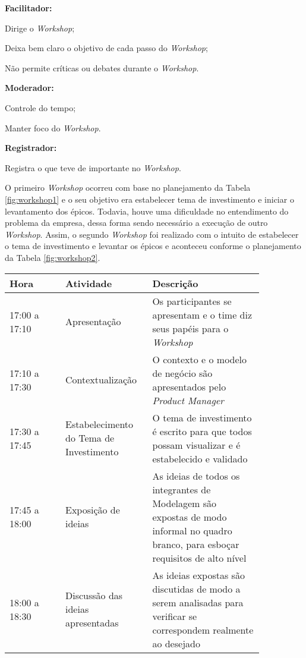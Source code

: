 \textbf{Facilitador:}

	Dirige o \textit{Workshop};
	
	Deixa bem claro o objetivo de cada passo do \textit{Workshop};
	
	Não permite críticas ou debates durante o \textit{Workshop}.
		
\textbf{Moderador:}

	Controle do tempo;
	
	Manter foco do \textit{Workshop}.
	
\textbf{Registrador:}

	Registra o que teve de importante no \textit{Workshop}.
	
O primeiro \textit{Workshop} ocorreu com base no planejamento da Tabela \ref{fig:workshop1} e o seu objetivo
era estabelecer tema de investimento e iniciar o levantamento dos épicos. Todavia, houve uma dificuldade no entendimento
do problema da empresa, dessa forma sendo necessário a execução de outro \textit{Workshop}. 
Assim, o segundo \textit{Workshop} foi realizado com o intuito de estabelecer o tema de investimento e levantar os épicos e aconteceu conforme o planejamento da Tabela
\ref{fig:workshop2}.

\begin{table*}[!h]
\centering
\caption{Planejamento do \textit{Workshop} 1}
\label{fig:workshop1}
  \begin{tabular}{p{0.20\linewidth}p{0.25\linewidth}p{0.40\linewidth}}
  \hline
   Hora  & Atividade & Descrição\\
  \hline

  17:00 a 17:10 & Apresentação & Os participantes se apresentam e o time diz seus papéis para o \textit{Workshop}\\

  17:10 a 17:30  & Contextualização & O contexto e o modelo de negócio são apresentados pelo \textit{Product Manager}\\

  17:30 a 17:45 & Estabelecimento do Tema de Investimento & O tema de investimento é escrito para que todos possam visualizar e é estabelecido e validado\\
  
  17:45 a 18:00 & Exposição de ideias & As ideias de todos os integrantes de Modelagem são expostas de modo informal no quadro branco, para esboçar requisitos de alto nível\\

  18:00 a 18:30 & Discussão das ideias apresentadas & As ideias expostas são discutidas de modo a serem analisadas para verificar se correspondem realmente ao desejado\\

  \hline
  \end{tabular}
\end{table*}

